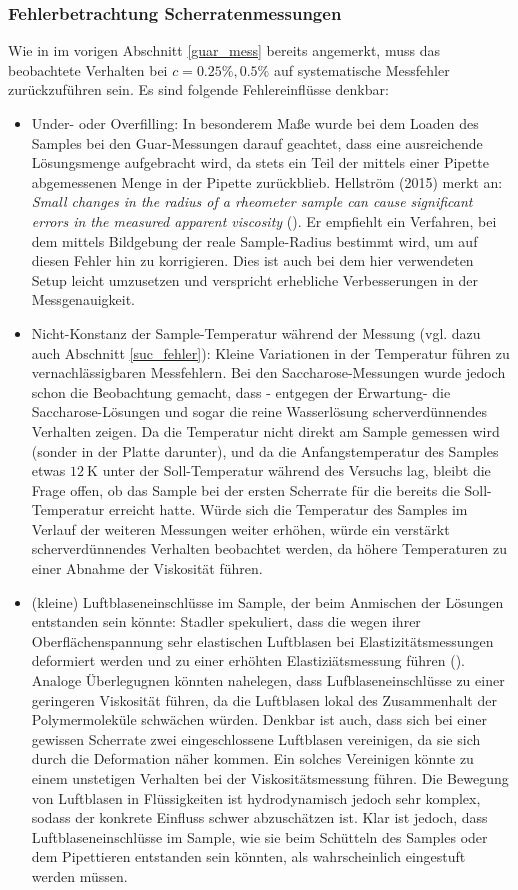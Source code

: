 \documentclass[11pt,a4paper,oneside]{scrartcl}
\begin{document}
\subsubsection{Fehlerbetrachtung Scherratenmessungen}\label{Guar_Fehler}
Wie in im vorigen Abschnitt \ref{guar_mess} bereits angemerkt, muss das beobachtete Verhalten bei $c=0.25\%,0.5\%$ auf systematische Messfehler zurückzuführen sein. Es sind folgende Fehlereinflüsse denkbar:
\begin{itemize}
\item Under- oder Overfilling: In besonderem Maße wurde bei dem Loaden des Samples bei den Guar-Messungen darauf geachtet, dass eine ausreichende Lösungsmenge aufgebracht wird, da stets ein Teil der mittels einer Pipette abgemessenen Menge in der Pipette zurückblieb. Hellström (2015) merkt an: \emph{\glqq Small changes in the radius of a rheometer sample can cause significant errors in the measured apparent viscosity \grqq} (\cite{Hellström_2015}). Er empfiehlt ein Verfahren, bei dem mittels Bildgebung der reale Sample-Radius bestimmt wird, um auf diesen Fehler hin zu korrigieren. Dies ist auch bei dem hier verwendeten Setup leicht umzusetzen und verspricht erhebliche Verbesserungen in der Messgenauigkeit.
\item Nicht-Konstanz der Sample-Temperatur während der Messung (vgl. dazu auch Abschnitt \ref{suc_fehler}): Kleine Variationen in der Temperatur führen zu vernachlässigbaren Messfehlern. Bei den Saccharose-Messungen wurde jedoch schon die Beobachtung gemacht, dass - entgegen der Erwartung- die Saccharose-Lösungen und sogar die reine Wasserlösung scherverdünnendes Verhalten zeigen. Da die Temperatur nicht direkt am Sample gemessen wird (sonder in der Platte darunter), und da die Anfangstemperatur des Samples etwas $12\ \mathrm K$ unter der Soll-Temperatur während des Versuchs lag, bleibt die Frage offen, ob das Sample bei der ersten Scherrate für die bereits die Soll-Temperatur erreicht hatte. Würde sich die Temperatur des Samples im Verlauf der weiteren Messungen weiter erhöhen, würde ein verstärkt scherverdünnendes Verhalten beobachtet werden, da höhere Temperaturen zu einer Abnahme der Viskosität führen.
\item (kleine) Luftblaseneinschlüsse im Sample, der beim Anmischen der Lösungen entstanden sein könnte: Stadler spekuliert, dass die wegen ihrer Oberflächenspannung sehr elastischen Luftblasen bei Elastizitätsmessungen deformiert werden und zu einer erhöhten Elastiziätsmessung führen (\cite{Stadler2014}). Analoge Überlegugnen könnten nahelegen, dass Lufblaseneinschlüsse zu einer geringeren Viskosität führen, da die Luftblasen lokal des Zusammenhalt der Polymermoleküle schwächen würden. Denkbar ist auch, dass sich bei einer gewissen Scherrate zwei eingeschlossene Luftblasen vereinigen, da sie sich durch die Deformation näher kommen. Ein solches Vereinigen könnte zu einem unstetigen Verhalten bei der Viskositätsmessung führen. Die Bewegung von Luftblasen in Flüssigkeiten ist hydrodynamisch jedoch sehr komplex, sodass der konkrete Einfluss schwer abzuschätzen ist.  Klar ist jedoch, dass Luftblaseneinschlüsse im Sample, wie sie beim Schütteln des Samples oder dem Pipettieren entstanden sein könnten, als wahrscheinlich eingestuft werden müssen.

\end{itemize}
\end{document}
